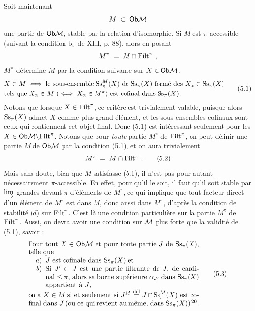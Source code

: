 Soit maintenant
\[
M \;\subset\; \mathsf{Ob}\mathcal{M}
\]
une partie de $\mathsf{Ob}\mathcal{M}$, stable par la relation d'isomorphie. Si $M$ est $\pi$-accessible (suivant la condition $\mathrm{b}_{\pi}$ de XIII, p. 88), alors en posant
\[
M^{\pi} \;=\; M \cap \mathrm{Filt}^{\pi} \ ,
\]
$M^{\pi}$ détermine $M$ par la condition suivante sur $X \in \mathsf{Ob}\mathcal{M}$.
\[
\begin{aligned}
&X \in M \iff \text{le sous-ensemble } \Ss^{M}_{\pi}(X) \text{ de } \Ss_{\pi}(X) \text{ formé des } X_{\alpha} \in \Ss_{\pi}(X)\\
&\text{tels que } X_{\alpha} \in M \ (\iff X_{\alpha} \in M^{\pi}) \text{ est cofinal dans } \Ss_{\pi}(X).
\end{aligned}
\tag*{(5.1)}
\]
Notons que lorsque $X \in \mathrm{Filt}^{\pi}$, ce critère est trivialement valable, puisque alors $\mathrm{Ss}_{\pi}(X)$ admet $X$ comme plus grand élément, et les sous-ensembles cofinaux sont ceux qui contiennent cet objet final. Donc (5.1) est intéressant seulement pour les $X \in \mathsf{Ob}\mathcal{M} \backslash \mathrm{Filt}^{\pi}$. Notons que pour \textit{toute} partie $M^{\pi}$ de $\mathrm{Filt}^{\pi}$, on peut définir une partie $M$ de $\mathsf{Ob}\mathcal{M}$ par la condition (5.1), et on aura trivialement
\[
M^{\pi} \;=\; M \cap \Filt^{\pi} \ . \tag*{(5.2)}
\]
Mais sans doute, bien que $M$ satisfasse (5.1), il n'est pas pour autant nécessairement $\pi$-accessible. En effet, pour qu'il le soit, il faut qu'il soit stable par $\varinjlim$
grandes devant $\pi$ d'éléments de $M^{\pi}$, ce qui implique que tout facteur direct d'un élément de $M^{\pi}$ est dans $M$, donc aussi dans $M^{\pi}$, d'après la condition de stabilité ($d$) sur $\mathrm{Filt}^{\pi}$. C'est là une condition particulière sur la partie $M^{\pi}$ de $\mathrm{Filt}^{\pi}$. Aussi, on devra avoir une condition sur $\mathcal{M}$ plus forte que la validité de (5.1), savoir :
\[
\parbox{0.72\textwidth}{Pour tout $X \in \Ob\cM$ et pour toute partie $J$ de $\Ss_{\pi}(X)$, telle que
\begin{enumerate}[nosep]
\item[\textit{a})] $J$ est cofinale dans $\Ss_{\pi}(X)$ et
\item[\textit{b})] Si $J' \subset J$ est une partie filtrante de $J$, de cardinal $\leq \pi$, alors sa borne supérieure $\alpha_{J'}$ dans $\Ss_{\pi}(X)$ appartient à $J$,
\end{enumerate}
on a $X \in M$ si et seulement si $J^{M} \overset{\text{déf}}{=} J \cap \Ss^{M}_{\pi}(X)$ est cofinal dans $J$ (ou ce qui revient au même, dans $\Ss_{\pi}(X)$)\,\footnotemark[20].}
\tag*{(5.3)}
\]

